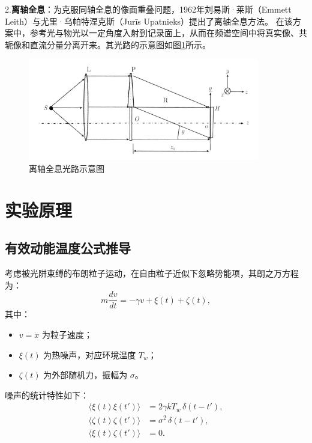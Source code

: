 \documentclass[a4paper,draft]{report}
\begin{document}
2.\textbf{离轴全息}：为克服同轴全息的像面重叠问题，1962年刘易斯·莱斯（Emmett Leith）与尤里·乌帕特涅克斯（Jurīs Upatnieks）提出了离轴全息方法。
在该方案中，参考光与物光以一定角度入射到记录面上，从而在频谱空间中将真实像、共轭像和直流分量分离开来。其光路的示意图如图\ref{fig:lizhoushiyi}\cite{shuzi1}所示。
\begin{figure}[H]
    \centering
    \includegraphics[width=0.9\textwidth]{离轴示意图}
    \caption{离轴全息光路示意图}
    \label{fig:lizhoushiyi} 
\end{figure}

\chapter{实验原理}
\section{有效动能温度公式推导}

考虑被光阱束缚的布朗粒子运动，在自由粒子近似下忽略势能项，其朗之万方程为：
\begin{equation}
m \frac{dv}{dt} = -\gamma v + \xi(t) + \zeta(t),
\end{equation}
其中：
\begin{itemize}
    \item $v = \dot{x}$ 为粒子速度；
    \item $\xi(t)$ 为热噪声，对应环境温度 $T_w$；
    \item $\zeta(t)$ 为外部随机力，振幅为 $\sigma$。
\end{itemize}

噪声的统计特性如下：
\begin{align}
\langle \xi(t) \xi(t') \rangle &= 2\gamma k T_w \,\delta(t - t'), \\
\langle \zeta(t) \zeta(t') \rangle &= \sigma^2 \,\delta(t - t'), \\
\langle \xi(t) \zeta(t') \rangle &= 0.
\end{align}
\end{document}
